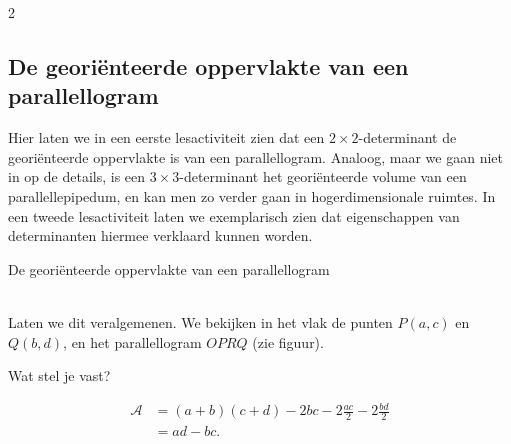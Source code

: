 \begin{multicols}{2}
\subsection{De georiënteerde oppervlakte van een parallellogram}
Hier laten we in een eerste lesactiviteit zien dat een $2\times 2$-determinant de georiënteerde oppervlakte is van een parallellogram. Analoog, maar we gaan niet in op de details, is een $3\times 3$-determinant het georiënteerde volume van een parallellepipedum, en kan men zo verder gaan in hogerdimensionale ruimtes. In een tweede lesactiviteit laten we exemplarisch zien dat eigenschappen van determinanten hiermee verklaard kunnen worden.
\ \\
\end{multicols}
\begin{lesactiviteit}{De georiënteerde oppervlakte van een parallellogram}

\begin{vraagenantwoord}

    
\end{vraagenantwoord}
\ \\
Laten we dit veralgemenen. We bekijken in het vlak de punten $P(a, c)$ en  $Q(b, d)$, en het parallellogram $OPRQ$ (zie figuur).


\begin{vraagenantwoord}[resume]
 Wat stel je vast?


\begin{align*}
\mathcal{A} &=(a+b)(c+d)-2bc-2\frac{ac}{2}-2\frac{bd}{2}\\
&=ad-bc.
\end{align*}


\end{vraagenantwoord}
\end{lesactiviteit}

